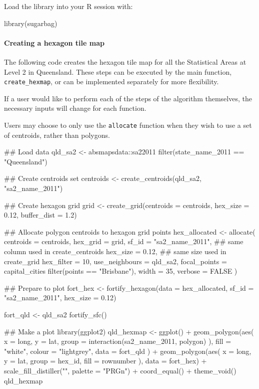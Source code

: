 Load the library into your R session with:

\begin{Schunk}
\begin{Sinput}
library(sugarbag)
\end{Sinput}
\end{Schunk}

\hypertarget{creating-a-hexagon-tile-map}{%
\paragraph{Creating a hexagon tile
map}\label{creating-a-hexagon-tile-map}}

The following code creates the hexagon tile map for all the Statistical
Areas at Level 2 in Queensland. These steps can be executed by the main
function, \texttt{create\_hexmap}, or can be implemented separately for
more flexibility.

If a user would like to perform each of the steps of the algorithm
themselves, the necessary inputs will change for each function.

Users may choose to only use the \texttt{allocate} function when they
wish to use a set of centroids, rather than \citep{sf} polygons.

\begin{Schunk}
\begin{Sinput}
## Load data
qld_sa2 <- absmapsdata::sa22011 %
  filter(state_name_2011 == "Queensland")

## Create centroids set
centroids <- create_centroids(qld_sa2, "sa2_name_2011")

## Create hexagon grid
grid <- create_grid(centroids = centroids,
                    hex_size = 0.12,
                    buffer_dist = 1.2)

## Allocate polygon centroids to hexagon grid points
hex_allocated <- allocate(
  centroids = centroids,
  hex_grid = grid,
  sf_id = "sa2_name_2011",
  ## same column used in create_centroids
  hex_size = 0.12,
  ## same size used in create_grid
  hex_filter = 10,
  use_neighbours = qld_sa2,
  focal_points = capital_cities %
    filter(points == "Brisbane"),
  width = 35,
  verbose = FALSE
)

## Prepare to plot
fort_hex <- fortify_hexagon(data = hex_allocated,
                            sf_id = "sa2_name_2011",
                            hex_size = 0.12)

fort_qld <- qld_sa2 %
  fortify_sfc()

## Make a plot
library(ggplot2)
qld_hexmap <- ggplot() +
  geom_polygon(aes(
      x = long,
      y = lat,
      group = interaction(sa2_name_2011, polygon)
    ),
    fill = "white",
    colour = "lightgrey",
    data = fort_qld
  ) +
  geom_polygon(aes(
    x = long,
    y = lat,
    group = hex_id,
    fill = rownumber
  ),
  data = fort_hex) +
  scale_fill_distiller("", palette = "PRGn") +
  coord_equal() + theme_void()
qld_hexmap
\end{Sinput}
\end{Schunk}

